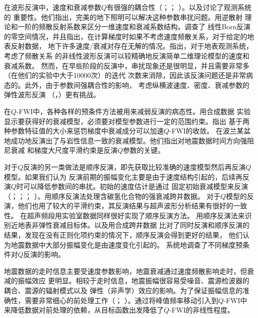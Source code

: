 在波形反演中，速度和衰减参数$Q$有很强的耦合性（；；
）。以及讨论了观测系统的
重要性。他们指出，完美的地下照明可以解决这种参数串扰问题。用逆散射
理论和一阶的频散反射系数来区分一维速度和衰减系数结构。调查了
线性Born反演的零空间情况，并且指出，在计算梯度时如果不考虑速度频散关系，对于给定的地表反射数据，
地下许多速度/衰减对存在无解的情况。指出，对于地表观测系统，考虑了频散关系
的非线性波形反演可以较精确地反演简单二维理论模型的速度和衰减系数。
然而，在早些阶段的反演中，串扰现象还是很明显，并且需要非常多（在他们的实验中大于10000次）的迭代
次数来消除，因此该反演问题还是非常病态的。此外，由于参数间强耦合性的影响，
考虑纵横波速度、密度、衰减参数的弹性波形反演
（，）更有挑战。

在$Q$-FWI中，各种各样的预条件方法被用来减弱反演的病态性。用合成数据
实验显示要获得好的衰减模型，必须要对模型参数进行一定的范围约束。指出
基于两种参数特征值的大小来惩罚梯度中衰减成分可以加速$Q$-FWI的收敛。
在波兰某盆地成功地反演出了与岩性信息一致的衰减模型。他们指出对地震数据时间方向强阻尼衰减
和梯度大尺度平滑约束是反演$Q$参数的关键。

对于$Q$反演的另一类做法是顺序反演，即先获取比较准确的速度模型然后再反演$Q$模型。如果我们认为
反演前期的振幅变化主要是由于速度结构引起的，后续再反演$Q$时可以降低参数间的串扰。初始的速度估计是通过
固定初始衰减模型来反演（；；；
）。用顺序反演法处理含碳氢化合物的强衰减跨井数据。
对于$Q$模型的反演，他们也用了较大的平滑约束，其反演结果与超声波形分析结果有很好的一致性。
在超声频段用实验室数据同样很好实现了顺序反演方法。
用顺序反演法来识别近地表非弹性衰减目标体。以及用合成跨井数据
比对了同时反演和顺序反演的结果，发现在没有正则化项约束的情况下，顺序反演会得到更好的结果，
他们认为地震数据中大部分振幅变化是由速度变化引起的。
系统地调查了不同梯度预条件对$Q$反演的影响。

地震数据的走时信息主要受速度参数影响，地震衰减通过速度频散影响走时，但衰减的振幅效应
更明显。相较于走时信息，地震振幅很容易受噪音、震源检波器的耦合、震源的辐射模式以及
弹性（非声学）效应的影响。为了保证振幅信息的准确性，需要非常细心的前处理工作（；
）。通过将峰值频率移动引入到$Q$-FWI中
来降低数据对前处理的依赖，从目标函数出发降低了$Q$-FWI的非线性程度。

